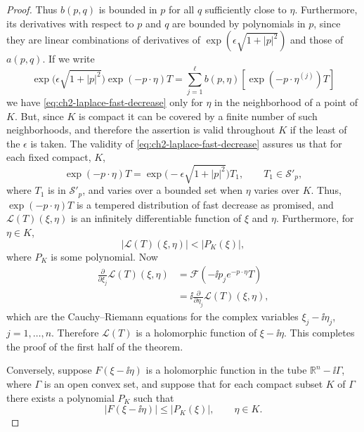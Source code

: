 \begin{proof}
Thus $b(p,q)$ is bounded in $p$ for all $q$ sufficiently close to $\eta$.
Furthermore, its derivatives with respect to $p$ and $q$ are bounded by
polynomials in $p$, since they are linear combinations of derivatives of
$\exp(\epsilon\sqrt{1+|p|^2})$ and those of $a(p,q)$.  If we write
\begin{equation*}
  \exp\bigl(\epsilon\sqrt{1+|p|^2}\bigr)\exp(-p\cdot\eta)T
  =\sum_{j=1}^{\ell}b(p,\eta)
  [\exp(-p\cdot\eta^{(j)})T]
\end{equation*}
we have \eqref{eq:ch2-laplace-fast-decrease} only for $\eta$ in the neighborhood of a point of $K$.
But, since $K$ is compact it can be covered by a finite number of such
neighborhoods, and therefore the assertion is valid throughout $K$ if the
least of the $\epsilon$ is taken.  The validity of \eqref{eq:ch2-laplace-fast-decrease} assures us that
for each fixed compact, $K$,
\begin{equation*}
  \exp(-p\cdot\eta)T
  =\exp\bigl(-\epsilon\sqrt{1+|p|^2}\bigr)T_1,
  \qquad T_1\in\mathcal{S}'_p,
\end{equation*}
where $T_1$ is in $\mathcal{S}'_p$, and varies over a bounded set when
$\eta$ varies over $K$.  Thus, $\exp(-p\cdot\eta)T$ is a tempered
distribution of fast decrease as promised, and $\mathcal{L}(T)(\xi,\eta)$
is an infinitely differentiable function of $\xi$ and $\eta$.  Furthermore,
for $\eta\in K$,
\begin{equation}
  |\mathcal{L}(T)(\xi,\eta)|< |P_K(\xi)|,
  \tag{2-71}\label{eq:ch2-laplace-bound-proof}
\end{equation}
where $P_K$ is some polynomial.  Now
\begin{align*}
  \frac{\partial}{\partial\xi_j}\mathcal{L}(T)(\xi,\eta)
  &=\mathcal{F}(-\ii p_j e^{-p\cdot\eta}T) \\
  &=\ii\frac{\partial}{\partial\eta_j}\mathcal{L}(T)(\xi,\eta),
\end{align*}
which are the Cauchy--Riemann equations for the complex variables
$\xi_j-\ii\eta_j$, $j=1,\ldots,n$.  Therefore $\mathcal{L}(T)$ is a
holomorphic function of $\xi-\ii\eta$.  This completes the proof of the
first half of the theorem.

Conversely, suppose $F(\xi-\ii\eta)$ is a holomorphic function in the tube
$\mathbb{R}^n-\ii\Gamma$, where $\Gamma$ is an open convex set, and suppose
that for each compact subset $K$ of $\Gamma$ there exists a polynomial
$P_K$ such that
\begin{equation}
  |F(\xi-\ii\eta)|\leq |P_K(\xi)|,\qquad \eta\in K.
  \tag{2-72}\label{eq:ch2-laplace-converse-bound}
\end{equation}


\end{proof}
